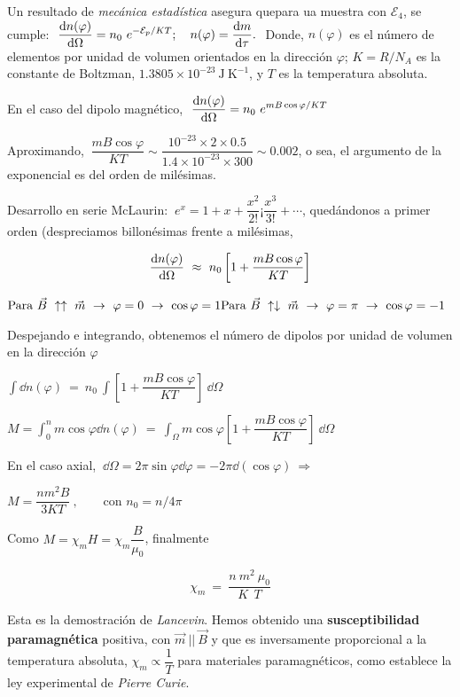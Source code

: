 Un resultado de \emph{mecánica estadística} asegura quepara ua muestra con $\mathcal E_4$, se cumple:
$\ \displaystyle \dv{n(\varphi)}{\Omega}=n_0\ e^{-\mathcal E_p / KT}; \quad n(\varphi)=\dv{m}{\tau}.\ $ Donde, $n(\varphi)$ es el número de elementos por unidad de volumen orientados en la dirección $\varphi$; $K=R/N_A$ es la constante de Boltzman, $1.3805\times 10^{-23}\ \mathrm{J\ K}^{-1}$, y $T$ es la temperatura absoluta.

En el caso del dipolo magnético, $\ \displaystyle \dv{n(\varphi)}{\Omega}= n_0\ e^{mB\cos \varphi / KT}$

Aproximando, $\ \dfrac{mB\cos \varphi}{KT} \sim \dfrac{10^{-23}\times 2 \times 0.5}{1.4\times 10^{-23} \times 300} \sim 0.002$, o sea, el argumento de la exponencial es del orden de milésimas.

Desarrollo en serie McLaurin: $\ e^x=1+x+\dfrac{x^2}{2!}¡\dfrac{x^3}{3!}+\cdots$, quedándonos a primer orden (despreciamos billonésimas frente a milésimas,

$$\displaystyle \dv{n(\varphi)}{\Omega} \ \approx \ n_0 \left[ 1 + \dfrac {mB\cos \varphi}{KT} \right]$$

$ \text{Para } \vec B \ \uparrow \uparrow \ \vec m \ \to \  \varphi=0 \ \to \ \cos \varphi = 1 \\
\text{Para } \vec B \ \uparrow \downarrow \ \vec m \ \to \  \varphi=\pi \ \to \ \cos \varphi = -1 $

Despejando e integrando, obtenemos el número de dipolos por unidad de volumen en la dirección $\varphi$

$\displaystyle \int \dd n(\varphi) \ = \ n_0\ \int \left[ 1 + \dfrac {mB\cos \varphi}{KT} \right] \ \dd \Omega$

$\displaystyle M=\int_0^n  m \cos \varphi \dd n(\varphi) \ = \ \int_\Omega m \cos \varphi \left[ 1 + \dfrac {mB\cos \varphi}{KT} \right] \ \dd \Omega$

En el caso axial, $\ \dd \Omega = 2\pi \sin \varphi \dd \varphi = -2\pi \dd (\cos \varphi) \ \Rightarrow $

$ M=\dfrac{nm^2B}{3KT}\ , \qquad \text{con } n_0=n/4\pi$

Como $M=\chi_m H=\chi_m \dfrac B {\mu_0}$, finalmente

$$\chi_m \ = \ \dfrac {n\ m^2 \ \mu_0}{K \ \ T}$$

Esta es la demostración de \emph{Lancevin}. Hemos obtenido una \textbf{susceptibilidad paramagnética} positiva, con $\vec m \ || \ \vec B$ y que es inversamente proporcional a la temperatura absoluta, $\chi_m \propto \dfrac 1 T$ para materiales paramagnéticos, como establece la ley experimental de \emph{Pierre Curie}.

